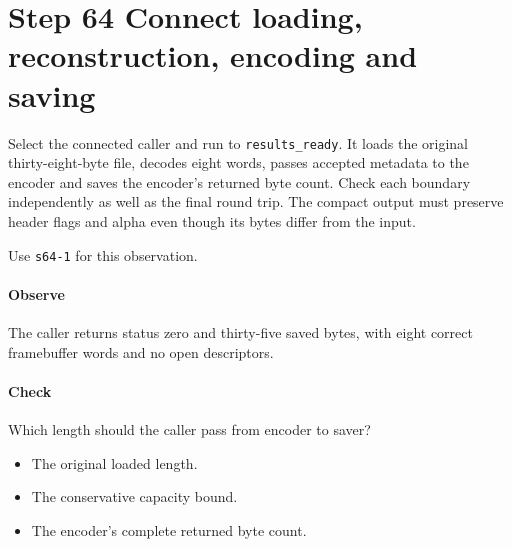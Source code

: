 \section{Step 64 Connect loading, reconstruction, encoding and saving}\label{qoi-s64}
Select the connected caller and run to \texttt{results\_ready}. It loads the original thirty-eight-byte file, decodes eight words, passes accepted metadata to the encoder and saves the encoder’s returned byte count. Check each boundary independently as well as the final round trip. The compact output must preserve header flags and alpha even though its bytes differ from the input.

Use \texttt{s64-1} for this observation.

\paragraph{Observe} The caller returns status zero and thirty-five saved bytes, with eight correct framebuffer words and no open descriptors.

\paragraph{Check} Which length should the caller pass from encoder to saver?
\begin{itemize}
  \item[A.] The original loaded length.
  \item[B.] The conservative capacity bound.
  \item[C.] The encoder’s complete returned byte count.
\end{itemize}
